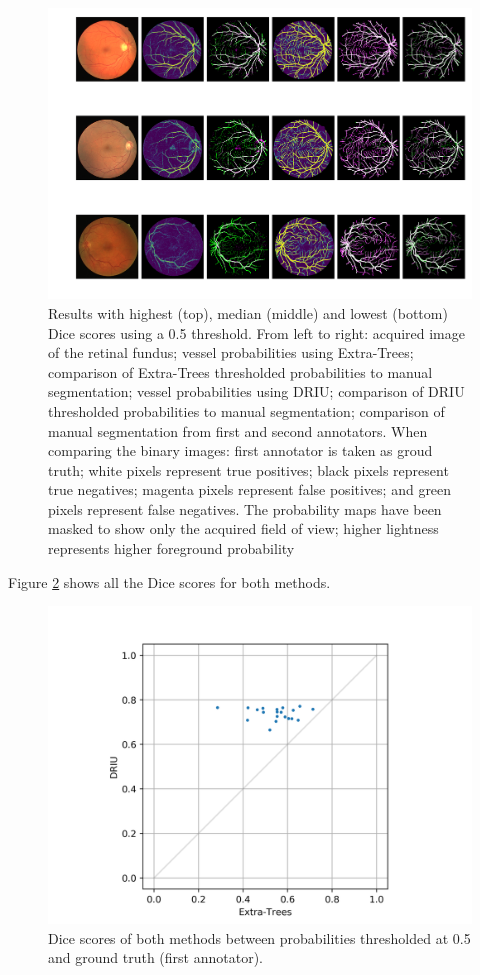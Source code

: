 \begin{figure}
  \includegraphics[width=\textwidth]{figures/collage}
  \caption{Results with highest (top), median (middle) and lowest (bottom) Dice scores using a 0.5 threshold. From left to right: acquired image of the retinal fundus; vessel probabilities using Extra-Trees; comparison of Extra-Trees thresholded probabilities to manual segmentation; vessel probabilities using DRIU; comparison of DRIU thresholded probabilities to manual segmentation; comparison of manual segmentation from first and second annotators. When comparing the binary images: first annotator is taken as groud truth; white pixels represent true positives; black pixels represent true negatives; magenta pixels represent false positives; and green pixels represent false negatives. The probability maps have been masked to show only the acquired field of view; higher lightness represents higher foreground probability} \label{fig:collage}
\end{figure}

Figure \ref{fig:dice} shows all the Dice scores for both methods.

\begin{figure}
  \includegraphics[width=\textwidth]{figures/dices}
  \caption{Dice scores of both methods between probabilities thresholded at 0.5 and ground truth (first annotator).} \label{fig:dice}
\end{figure}

